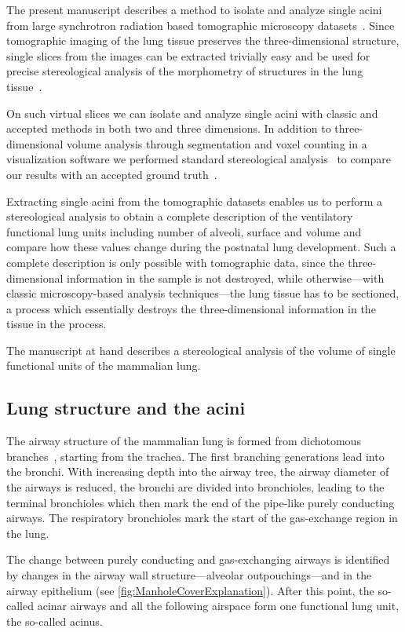 \documentclass[twoside,paper=a4,abstract=true,english,DIV=calc]{scrartcl}
\begin{document}
The present manuscript describes a method to isolate and analyze single acini from large synchrotron radiation based tomographic microscopy datasets~\cite{Haberthuer2010a}.
Since tomographic imaging of the lung tissue preserves the three-dimensional structure, single slices from the images can be extracted trivially easy and be used for precise stereological analysis of the morphometry of structures in the lung tissue~\cite{Hsia2010}.

On such virtual slices we can isolate and analyze single acini with classic and accepted methods in both two and three dimensions.
In addition to three-dimensional volume analysis through segmentation and voxel counting in a visualization software we performed standard stereological analysis~\cite{Hsia2010} to compare our results with an accepted ground truth~\cite{Rodriguez1987,Tschanz2003}.

Extracting single acini from the tomographic datasets enables us to perform a stereological analysis to obtain a complete description of the ventilatory functional lung units including number of alveoli, surface and volume and compare how these values change during the postnatal lung development.
Such a complete description is only possible with tomographic data, since the three-dimensional information in the sample is not destroyed, while otherwise---with classic microscopy-based analysis techniques---the lung tissue has to be sectioned, a process which essentially destroys the three-dimensional information in the tissue in the process.

The manuscript at hand describes a stereological analysis of the volume of single functional units of the mammalian lung.

\subsection{Lung structure and the acini}
The airway structure of the mammalian lung is formed from dichotomous branches~\cite{Weibel1991}, starting from the trachea.
The first branching generations lead into the bronchi.
With increasing depth into the airway tree, the airway diameter of the airways is reduced, the bronchi are divided into bronchioles, leading to the terminal bronchioles which then mark the end of the pipe-like purely conducting airways.
The respiratory bronchioles mark the start of the gas-exchange region in the lung.

The change between purely conducting and gas-exchanging airways is identified by changes in the airway wall structure---alveolar outpouchings---and in the airway epithelium (see \autoref{fig:ManholeCoverExplanation}).
After this point, the so-called acinar airways and all the following airspace form one functional lung unit, the so-called acinus.
\end{document}
